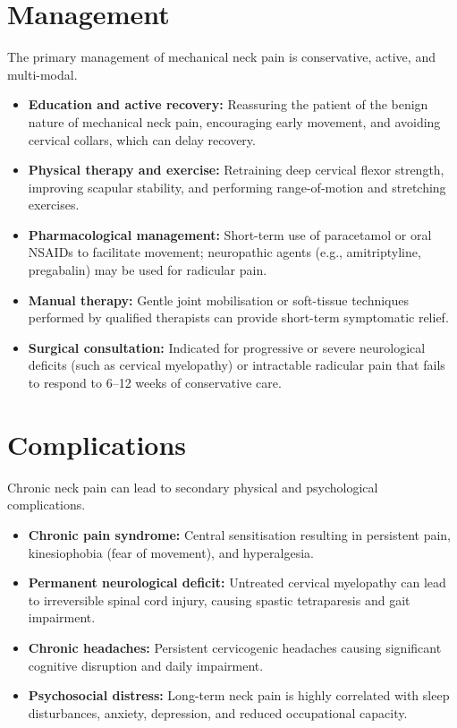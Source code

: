 \section*{Management}
The primary management of mechanical neck pain is conservative, active, and multi-modal.
\begin{itemize}
    \item \textbf{Education and active recovery:} Reassuring the patient of the benign nature of mechanical neck pain, encouraging early movement, and avoiding cervical collars, which can delay recovery.
    \item \textbf{Physical therapy and exercise:} Retraining deep cervical flexor strength, improving scapular stability, and performing range-of-motion and stretching exercises.
    \item \textbf{Pharmacological management:} Short-term use of paracetamol or oral NSAIDs to facilitate movement; neuropathic agents (e.g., amitriptyline, pregabalin) may be used for radicular pain.
    \item \textbf{Manual therapy:} Gentle joint mobilisation or soft-tissue techniques performed by qualified therapists can provide short-term symptomatic relief.
    \item \textbf{Surgical consultation:} Indicated for progressive or severe neurological deficits (such as cervical myelopathy) or intractable radicular pain that fails to respond to 6--12 weeks of conservative care.
\end{itemize}

\section*{Complications}
Chronic neck pain can lead to secondary physical and psychological complications.
\begin{itemize}
    \item \textbf{Chronic pain syndrome:} Central sensitisation resulting in persistent pain, kinesiophobia (fear of movement), and hyperalgesia.
    \item \textbf{Permanent neurological deficit:} Untreated cervical myelopathy can lead to irreversible spinal cord injury, causing spastic tetraparesis and gait impairment.
    \item \textbf{Chronic headaches:} Persistent cervicogenic headaches causing significant cognitive disruption and daily impairment.
    \item \textbf{Psychosocial distress:} Long-term neck pain is highly correlated with sleep disturbances, anxiety, depression, and reduced occupational capacity.
\end{itemize}

